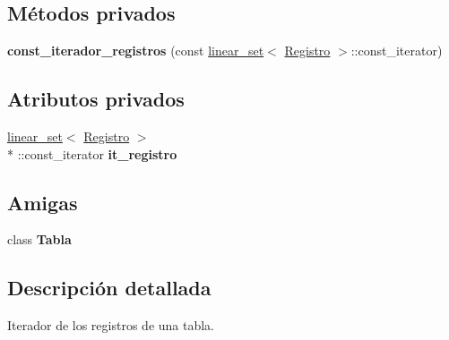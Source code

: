 \subsection*{Métodos privados}
\begin{DoxyCompactItemize}
\item 
\hypertarget{classTabla_1_1const__iterador__registros_a8dde708af2d71cf5dabfd3b42d15284f}{{\bfseries const\-\_\-iterador\-\_\-registros} (const \hyperlink{classlinear__set}{linear\-\_\-set}$<$ \hyperlink{classRegistro}{Registro} $>$\-::const\-\_\-iterator)}\label{classTabla_1_1const__iterador__registros_a8dde708af2d71cf5dabfd3b42d15284f}

\end{DoxyCompactItemize}
\subsection*{Atributos privados}
\begin{DoxyCompactItemize}
\item 
\hypertarget{classTabla_1_1const__iterador__registros_ab650d9f113456460fca266d31dffa484}{\hyperlink{classlinear__set}{linear\-\_\-set}$<$ \hyperlink{classRegistro}{Registro} $>$\\*
\-::const\-\_\-iterator {\bfseries it\-\_\-registro}}\label{classTabla_1_1const__iterador__registros_ab650d9f113456460fca266d31dffa484}

\end{DoxyCompactItemize}
\subsection*{Amigas}
\begin{DoxyCompactItemize}
\item 
\hypertarget{classTabla_1_1const__iterador__registros_a172484163cb8b80140c3053a4c68e4da}{class {\bfseries Tabla}}\label{classTabla_1_1const__iterador__registros_a172484163cb8b80140c3053a4c68e4da}

\end{DoxyCompactItemize}


\subsection{Descripción detallada}
Iterador de los registros de una tabla. 

